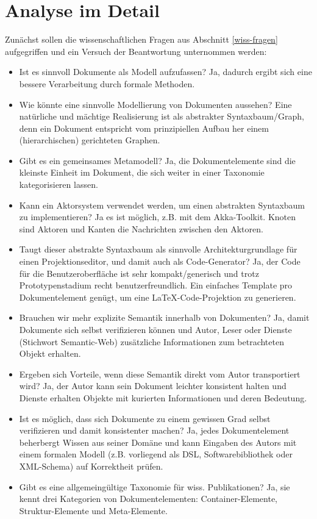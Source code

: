  
\section{Analyse im Detail}\label{}
 
Zunächst sollen die wissenschaftlichen Fragen aus Abschnitt \ref{wiss-fragen} aufgegriffen und  ein Versuch der Beantwortung unternommen werden:

 
\begin{itemize}

\item Ist es sinnvoll Dokumente als Modell aufzufassen? Ja, dadurch ergibt sich eine bessere Verarbeitung durch formale Methoden.
\item Wie könnte eine sinnvolle Modellierung von Dokumenten aussehen? Eine natürliche und mächtige Realisierung ist als abstrakter Syntaxbaum/Graph, denn ein Dokument entspricht vom prinzipiellen Aufbau her einem (hierarchischen) gerichteten Graphen.
\item Gibt es ein gemeinsames Metamodell? Ja, die Dokumentelemente sind die kleinste Einheit im Dokument, die sich weiter in einer Taxonomie kategorisieren lassen.
\item Kann ein Aktorsystem verwendet werden, um einen abstrakten Syntaxbaum zu implementieren? Ja es ist möglich, z.B. mit dem Akka-Toolkit. Knoten sind Aktoren und Kanten die Nachrichten zwischen den Aktoren.
\item Taugt dieser abstrakte Syntaxbaum als sinnvolle Architekturgrundlage für einen Projektionseditor, und damit auch als Code-Generator? Ja, der Code für die Benutzeroberfläche ist sehr kompakt/generisch und trotz Prototypenstadium recht benutzerfreundlich. Ein einfaches Template pro Dokumentelement genügt, um eine LaTeX-Code-Projektion zu generieren.
\item Brauchen wir mehr explizite Semantik innerhalb von Dokumenten? Ja, damit Dokumente sich selbst verifizieren können und Autor, Leser oder Dienste (Stichwort Semantic-Web) zusätzliche Informationen zum betrachteten Objekt erhalten.
\item Ergeben sich Vorteile, wenn diese Semantik direkt vom Autor transportiert wird? Ja, der Autor kann sein Dokument leichter konsistent halten und Dienste erhalten Objekte mit kurierten Informationen und deren Bedeutung.
\item Ist es möglich, dass sich Dokumente zu einem gewissen Grad selbst verifizieren und damit konsistenter machen? Ja, jedes Dokumentelement beherbergt Wissen aus seiner Domäne und kann Eingaben des Autors mit einem formalen Modell (z.B. vorliegend als DSL, Softwarebibliothek oder XML-Schema) auf Korrektheit prüfen.
\item Gibt es eine allgemeingültige Taxonomie für wiss. Publikationen? Ja, sie kennt drei Kategorien von Dokumentelementen: Container-Elemente, Struktur-Elemente und Meta-Elemente.
\end{itemize}
 
